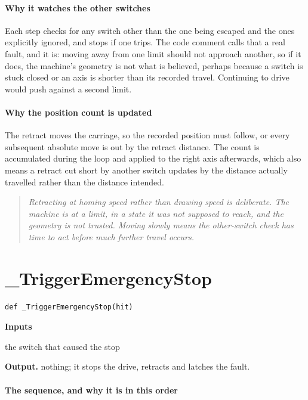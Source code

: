 \paragraph{Why it watches the other switches}
Each step checks for any switch other than the one being escaped and the ones explicitly ignored, and stops if one trips. The code comment calls that a real fault, and it is: moving away from one limit should not approach another, so if it does, the machine's geometry is not what is believed, perhaps because a switch is stuck closed or an axis is shorter than its recorded travel. Continuing to drive would push against a second limit.


\paragraph{Why the position count is updated}
The retract moves the carriage, so the recorded position must follow, or every subsequent absolute move is out by the retract distance. The count is accumulated during the loop and applied to the right axis afterwards, which also means a retract cut short by another switch updates by the distance actually travelled rather than the distance intended.


\begin{quote}\small\itshape Retracting at homing speed rather than drawing speed is deliberate. The machine is at a limit, in a state it was not supposed to reach, and the geometry is not trusted. Moving slowly means the other-switch check has time to act before much further travel occurs.\end{quote}

\section{\_TriggerEmergencyStop}
\begin{lstlisting}[style=sig]
def _TriggerEmergencyStop(hit)
\end{lstlisting}

\noindent\textbf{Inputs}
\begin{description}[leftmargin=2.2em,style=nextline,font=\normalfont\ttfamily]\setlength\itemsep{1pt}
  \item[{hit}] \normalfont the switch that caused the stop
\end{description}

\noindent\textbf{Output.} nothing; it stops the drive, retracts and latches the fault.


\paragraph{The sequence, and why it is in this order}

